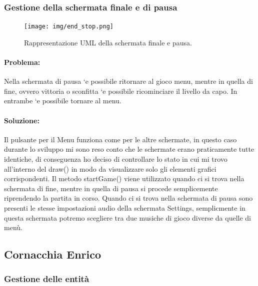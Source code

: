 \subsubsection{Gestione della schermata finale e di pausa}

\begin{figure}[H]
\centering{}
\texttt{[image: img/end\_stop.png]}
\caption{Rappresentazione UML della schermata finale e pausa.}
\end{figure}

\paragraph{Problema:}
Nella schermata di pausa `e possibile ritornare al gioco menu, mentre in quella di fine, ovvero vittoria o sconfitta `e possibile ricominciare il livello da capo. In entrambe `e possibile tornare al menu.

\paragraph{Soluzione:}
Il pulsante per il Menu funziona come per le altre schermate, in questo caso durante lo sviluppo mi sono reso conto che le schermate erano praticamente tutte identiche, di conseguenza ho deciso di controllare lo stato in cui mi trovo all’interno del draw() in modo da visualizzare solo gli elementi grafici corrispondenti. Il metodo startGame() viene utilizzato quando ci si trova nella schermata di fine, mentre in quella di pausa si procede semplicemente riprendendo la partita in corso. Quando ci si trova nella schermata di pausa sono presenti le stesse impostazioni audio della schermata Settings, semplicmente in questa schermata potremo scegliere tra due musiche di gioco diverse da quelle di menù.



\subsection{Cornacchia Enrico}

\subsubsection{Gestione delle entità}

